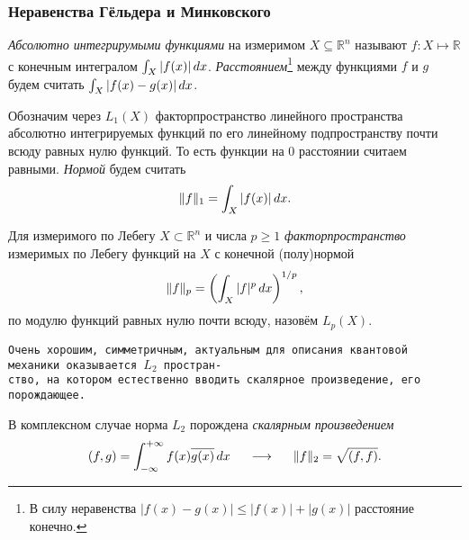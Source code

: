
\subsubsection*{Неравенства Гёльдера и Минковского}

\begin{to_def}
    \textit{Абсолютно интегрирумыми функциями} на измеримом $X \subseteq \mathbb{R}^n$ называют $f \colon X \mapsto \mathbb{R}$ с конечным интегралом $\int_X |f(x)| \, d x$. \textit{Расстоянием}\footnote{
        В силу неравенства $|f(x) - g(x)| \leq |f(x)| + |g(x)|$ расстояние конечно.
    } между функциями $f$ и $g$ будем считать $\int_X |f(x)-g(x)| \, d x$.
\end{to_def}

\begin{to_def}
    Обозначим через $L_1 (X)$ факторпространство  линейного пространства абсолютно интегрируемых функций по его линейному подпространству почти всюду равных нулю функций. То есть функции на $0$ расстоянии считаем равными. \textit{Нормой} будем считать
    \begin{equation*}
        \|f\|_1 = \int_X |f(x)| \, d x.
    \end{equation*}
\end{to_def}

\begin{to_def}
    Для измеримого по Лебегу $X \subset \mathbb{R}^n$ и числа $p \geq 1$ \textit{факторпространство} измеримых по Лебегу функций на $X$ с конечной (полу)нормой
    \begin{equation*}
        \|f\|_p
        = 
        \left(
            \int_X |f|^p \, d x
        \right)^{1/p},
    \end{equation*}
    по модулю функций равных нулю почти всюду,
    назовём $L_p (X)$.
\end{to_def}

\texttt{Очень хорошим, симметричным, актуальным для описания квантовой механики оказывается $L_2$ простран-\\ство, на котором естественно вводить скалярное произведение, его порождающее.} 

 \begin{to_def}
     В комплексном случае норма $L_2$ порождена \textit{скалярным произведением}
     \begin{equation*}
         (f, g) = \int_{-\infty}^{+\infty} f(x) \overline{g(x)} \, d x
         \hspace{0.5cm} \longrightarrow \hspace{0.5cm}
         \|f\|_2 = \sqrt{(f, f)}.
     \end{equation*}
 \end{to_def}


